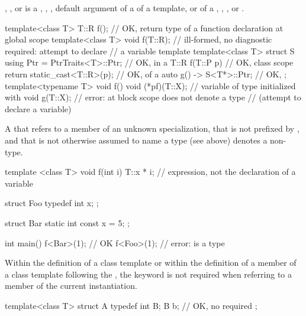 ,
, or
is a
,
,
,
default argument of a  of a template, or
 of a
,
,
, or
.
\begin{example}
\begin{codeblock}
template<class T> T::R f();             // OK, return type of a function declaration at global scope
template<class T> void f(T::R);         // ill-formed, no diagnostic required: attempt to declare
                                        // a  variable template
template<class T> struct S {
  using Ptr = PtrTraits<T>::Ptr;        // OK, in a 
  T::R f(T::P p) {                      // OK, class scope
    return static_cast<T::R>(p);        // OK,  of a 
  }
  auto g() -> S<T*>::Ptr;               // OK, 
};
template<typename T> void f() {
  void (*pf)(T::X);                     // variable  of type  initialized with 
  void g(T::X);                         // error:  at block scope does not denote a type
                                        // (attempt to declare a  variable)
}
\end{codeblock}
\end{example}

\pnum
A  that refers to a member of an unknown specialization,
that is not prefixed by ,
and that is not otherwise assumed to name a type (see above)
denotes a non-type.
\begin{example}
\begin{codeblock}
template <class T> void f(int i) {
  T::x * i;         // expression, not the declaration of a variable 
}

struct Foo {
  typedef int x;
};

struct Bar {
  static int const x = 5;
};

int main() {
  f<Bar>(1);        // OK
  f<Foo>(1);        // error:  is a type
}
\end{codeblock}
\end{example}

\pnum
Within the definition of a class template or within the definition of a
member of a class template following the , the keyword
is not required when referring to
a member of the current instantiation.
\begin{example}
\begin{codeblock}
template<class T> struct A {
  typedef int B;
  B b;              // OK, no  required
};
\end{codeblock}
\end{example}

